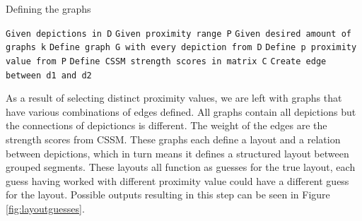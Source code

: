 \begin{algorithm}[H]
\caption{Defining the graphs}\label{alg:graph}
\begin{algorithmic}
\State \texttt{Given depictions in D}
\State \texttt{Given proximity range P}
\State \texttt{Given desired amount of graphs k}
\State \texttt{Define graph G with every depiction from D}
    \State \texttt{Define p proximity value from P}
    \State \texttt{Define CSSM strength scores in matrix C}
                \State \texttt{Create edge between d1 and d2}
            \EndIf
        \EndFor
    \EndFor
\EndFor

\end{algorithmic}
\end{algorithm}

As a result of selecting distinct proximity values, we are left with graphs that have various combinations of edges defined. All graphs contain all depictions but the connections of depictioncs is different. The weight of the edges are the strength scores from CSSM. These graphs each define a layout and a relation between depictions, which in turn means it defines a structured layout between grouped segments. These layouts all function as guesses for the true layout, each guess having worked with different proximity value could have a different guess for the layout. Possible outputs resulting in this step can be seen in Figure \ref{fig:layoutguesses}.

